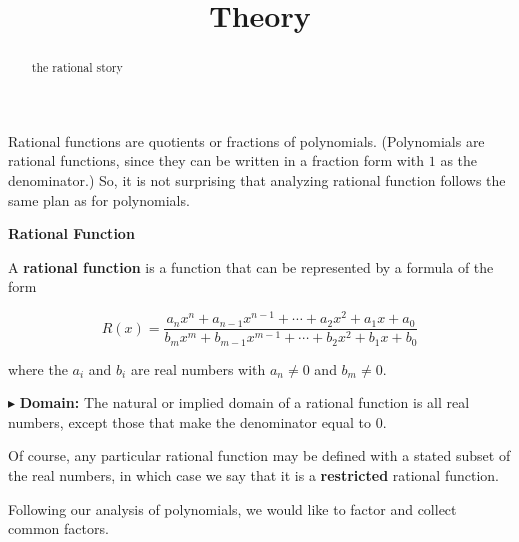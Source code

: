 \documentclass{ximera}
\title{Theory}
\begin{document}
\begin{abstract}
the rational story
\end{abstract}
\maketitle









Rational functions are quotients or fractions of polynomials.  (Polynomials are rational functions, since they can be written in a fraction form with $1$ as the denominator.)  So, it is not surprising that analyzing rational function follows the same plan as for polynomials.



















\begin{definition} \item \textbf{\textcolor{green!50!black}{Rational Function}}  


A \textbf{rational function} is a function that can be represented by a formula of the form


\[   R(x) = \frac{a_n x^n + a_{n-1} x^{n-1} + \cdots + a_2 x^2 + a_1 x + a_0}{b_m x^m + b_{m-1} x^{m-1} + \cdots + b_2 x^2 + b_1 x + b_0}        \]

where the $a_i$ and $b_i$ are real numbers with $a_n \ne 0$ and $b_m \ne 0$.


\end{definition}



$\blacktriangleright$ \textbf{Domain:} The natural or implied domain of a rational function is all real numbers, except those that make the denominator equal to $0$.  



Of course, any particular rational function may be defined with a stated subset of the real numbers, in which case we  say that it is a \textbf{restricted} rational function.








Following our analysis of polynomials, we would like to factor and collect common factors.
\end{document}
